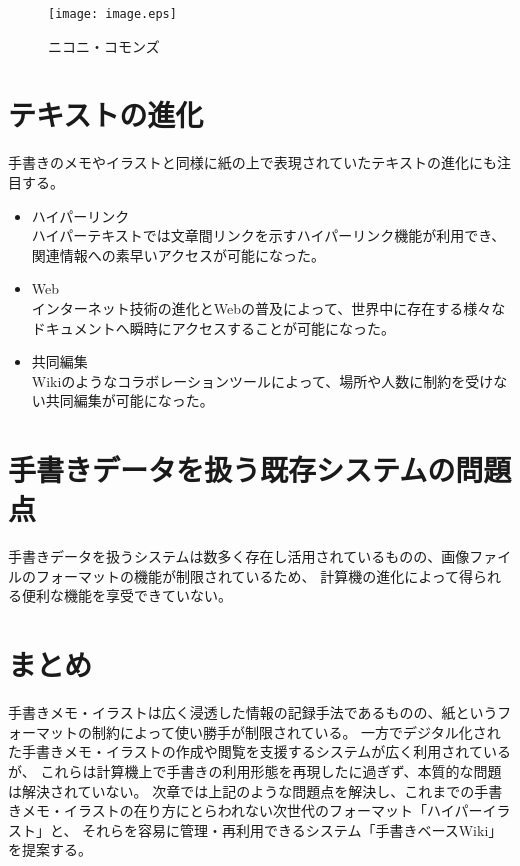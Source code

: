 \begin{figure}[htbp]
    \begin{center}
    {\texttt{[image: image.eps]}} \end{center}
    \caption{ニコニ・コモンズ}
\end{figure}


\section{テキストの進化}
手書きのメモやイラストと同様に紙の上で表現されていたテキストの進化にも注目する。
\begin{itemize}
    \item ハイパーリンク\\
    ハイパーテキストでは文章間リンクを示すハイパーリンク機能が利用でき、関連情報への素早いアクセスが可能になった。
    \item Web\\
    インターネット技術の進化とWebの普及によって、世界中に存在する様々なドキュメントへ瞬時にアクセスすることが可能になった。
    \item 共同編集\\
    Wikiのようなコラボレーションツールによって、場所や人数に制約を受けない共同編集が可能になった。
\end{itemize}


\section{手書きデータを扱う既存システムの問題点}
手書きデータを扱うシステムは数多く存在し活用されているものの、画像ファイルのフォーマットの機能が制限されているため、
計算機の進化によって得られる便利な機能を享受できていない。

\section{まとめ}
手書きメモ・イラストは広く浸透した情報の記録手法であるものの、紙というフォーマットの制約によって使い勝手が制限されている。
一方でデジタル化された手書きメモ・イラストの作成や閲覧を支援するシステムが広く利用されているが、
これらは計算機上で手書きの利用形態を再現したに過ぎず、本質的な問題は解決されていない。
次章では上記のような問題点を解決し、これまでの手書きメモ・イラストの在り方にとらわれない次世代のフォーマット「ハイパーイラスト」と、
それらを容易に管理・再利用できるシステム「手書きベースWiki」を提案する。